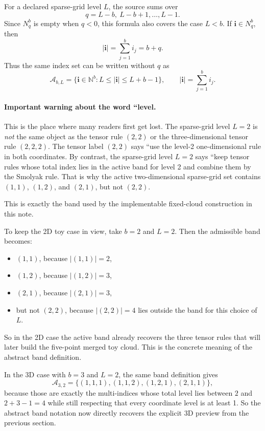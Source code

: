 \documentclass[11pt]{article}
\numberwithin{equation}{section}
\begin{document}
For a declared sparse-grid level \(L\), the source sums over
\[
  q=L-b,\ L-b+1,\ldots,L-1.
\]
Since \(N_q^b\) is empty when \(q<0\), this formula also covers the case
\(L<b\).  If \(\mathbf i\in N_q^b\), then
\begin{equation}
  |\mathbf i|=\sum_{j=1}^b i_j=b+q.
  \label{eq:p32-index-sum-q}
\end{equation}
Thus the same index set can be written without \(q\) as
\begin{equation}
  \mathcal A_{b,L}
  =
  \{\mathbf i\in\mathbb N^b: L\le |\mathbf i|\le L+b-1\},
  \qquad |\mathbf i|=\sum_{j=1}^b i_j.
  \label{eq:p31-level-band}
\end{equation}
\paragraph{Important warning about the word ``level.}
This is the place where many readers first get lost.  The sparse-grid level
\(L=2\) is \emph{not} the same object as the tensor rule \((2,2)\) or the
three-dimensional tensor rule \((2,2,2)\).  The tensor label \((2,2)\) says
``use the level-2 one-dimensional rule in both coordinates.  By contrast, the
sparse-grid level \(L=2\) says ``keep tensor rules whose total index lies in the
active band for level 2 and combine them by the Smolyak rule.  That is why the
active two-dimensional sparse-grid set contains \((1,1)\), \((1,2)\), and
\((2,1)\), but not \((2,2)\).

This is exactly the band used by the implementable fixed-cloud construction in
this note.

To keep the 2D toy case in view, take \(b=2\) and \(L=2\).  Then the admissible
band becomes:
\begin{itemize}[leftmargin=0.28in]
  \item \((1,1)\), because \(|(1,1)|=2\),
  \item \((1,2)\), because \(|(1,2)|=3\),
  \item \((2,1)\), because \(|(2,1)|=3\),
  \item but not \((2,2)\), because \(|(2,2)|=4\) lies outside the band for this
  choice of \(L\).
\end{itemize}
So in the 2D case the active band already recovers the three tensor rules that
will later build the five-point merged toy cloud.  This is the concrete meaning
of the abstract band definition.

In the 3D case with \(b=3\) and \(L=2\), the same band definition gives
\begin{equation}
  \mathcal A_{3,2}
  =
  \{(1,1,1),(1,1,2),(1,2,1),(2,1,1)\},
  \label{eq:p38-A32}
\end{equation}
because those are exactly the multi-indices whose total level lies between
\(2\) and \(2+3-1=4\) while still respecting that every coordinate level is at
least 1.  So the abstract band notation now directly recovers the explicit 3D
preview from the previous section.
\end{document}
